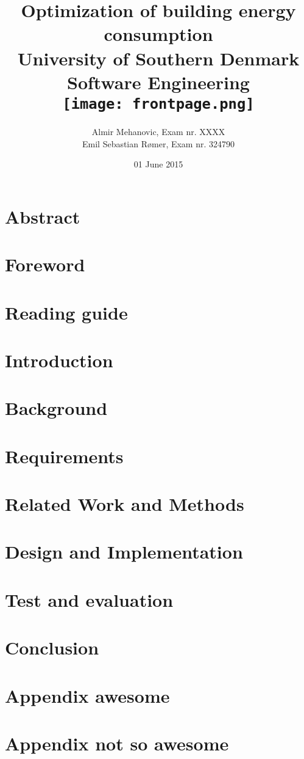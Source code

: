 \documentclass[35pt]{report}
\title{
	{Optimization of building energy consumption}\\
	{\large University of Southern Denmark \\Software Engineering }\\
	{\texttt{[image: frontpage.png]}}
}
\author{Almir Mehanovic, Exam nr. XXXX\\Emil Sebastian Rømer, Exam nr. 324790}
\date{01 June 2015}
\begin{document}
\maketitle

\chapter*{Abstract}


\chapter*{Foreword}


\tableofcontents

\chapter*{Reading guide}


\chapter{Introduction}


\chapter{Background}


\chapter{Requirements}


\chapter{Related Work and Methods}


\chapter{Design and Implementation}


\chapter{Test and evaluation}

\chapter{Conclusion}



\appendix
\chapter{Appendix awesome}

\chapter{Appendix not so awesome}

\end{document}
